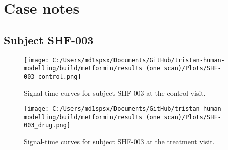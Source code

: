\documentclass{epflreport}%
\begin{document}
\section{Case notes}%
\label{sec:Casenotes}%

%
\subsection{Subject SHF{-}003}%
\label{subsec:SubjectSHF{-}003}%

%


\begin{figure}[h!]%
\centering%
\texttt{[image: C:/Users/md1spsx/Documents/GitHub/tristan-human-modelling/build/metformin/results (one scan)/Plots/SHF-003\_control.png]}%
\caption{Signal{-}time curves for subject SHF{-}003 at the control visit.}%
\end{figure}

%


\begin{figure}[h!]%
\centering%
\texttt{[image: C:/Users/md1spsx/Documents/GitHub/tristan-human-modelling/build/metformin/results (one scan)/Plots/SHF-003\_drug.png]}%
\caption{Signal{-}time curves for subject SHF{-}003 at the treatment visit.}%
\end{figure}
\end{document}
